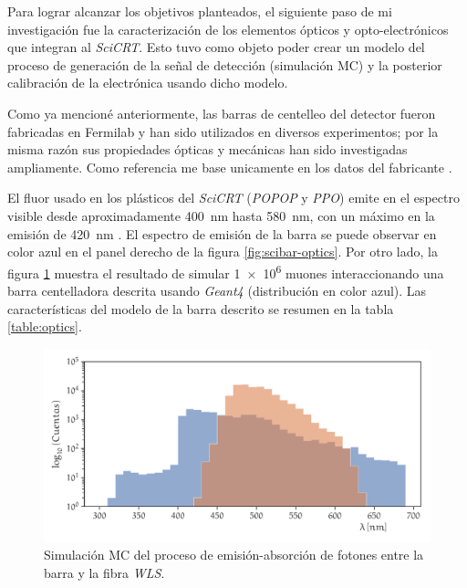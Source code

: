 Para lograr alcanzar los objetivos planteados, el siguiente paso de mi investigación fue la caracterización de los elementos ópticos y opto-electrónicos que integran al \emph{SciCRT}. Esto tuvo como objeto poder crear un modelo del proceso de generación de la señal de detección (simulación MC) y la posterior calibración de la electrónica usando dicho modelo.

Como ya mencioné anteriormente, las barras de centelleo del detector fueron fabricadas en Fermilab y han sido utilizados en diversos experimentos; por la misma razón sus propiedades ópticas y mecánicas han sido investigadas ampliamente. Como referencia me base unicamente en los datos del fabricante \cite{beznosko}.

El fluor usado en los plásticos del \emph{SciCRT} (\emph{POPOP} y \emph{PPO}) emite en el espectro visible desde aproximadamente \SI{400}{\nano\metre} hasta \SI{580}{\nano\metre}, con un máximo en la emisión de \SI{420}{\nano\metre} \cite{kikawa14}. El espectro de emisión de la barra se puede observar en color azul en el panel derecho de la figura \ref{fig:scibar-optics}. Por otro lado, la figura \ref{fig:sim-optics} muestra el resultado de simular \num{1e6} muones interaccionando una barra centelladora descrita usando \emph{Geant4} \cite{geant403,geant406} (distribución en color azul). Las características del modelo de la barra descrito se resumen en la tabla \ref{table:optics}.

\begin{figure}
        \centering
        \includegraphics[width=\textwidth]{sim-optics-spect.pdf}
        \caption{Simulación MC del proceso de emisión-absorción de fotones entre la barra y la fibra \emph{WLS}.}
        \label{fig:sim-optics}
\end{figure}

